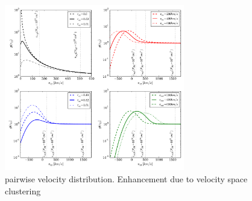 \documentclass[useAMS,usenatbib,twocolumn]{mn2e}
\begin{document}
\begin{figure}
 \begin{center}
  \includegraphics[angle=0,width=0.7\textwidth]{figure/v12_distribution.pdf}
  \caption{pairwise velocity distribution. Enhancement due to velocity space
  clustering}
 \end{center}
\end{figure}
\end{document}
